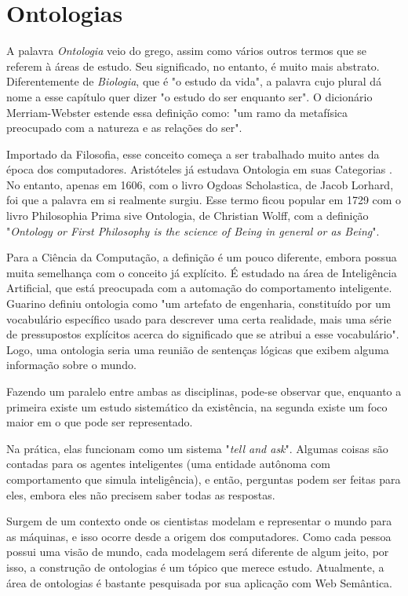 
\chapter{Ontologias}

\lettrine{A}{} palavra \textit{Ontologia} veio do grego, assim como vários outros termos que se referem à áreas de estudo. Seu significado, no entanto, é muito mais abstrato. Diferentemente de \textit{Biologia}, que é "o estudo da vida", a palavra cujo plural dá nome a esse capítulo quer dizer "o estudo do ser enquanto ser". O dicionário Merriam-Webster \cite{ontoMerriam} estende essa definição como: "um ramo da metafísica preocupado com a natureza e as relações do ser".

Importado da Filosofia, esse conceito começa a ser trabalhado muito antes da época dos computadores. Aristóteles já estudava Ontologia em suas Categorias \cite{ontoDahlberg}. No entanto, apenas em 1606, com o livro Ogdoas Scholastica, de Jacob Lorhard, foi que a palavra em si realmente surgiu. Esse termo ficou popular em 1729 com o livro Philosophia Prima sive Ontologia, de Christian Wolff, com a definição "\textit{Ontology or First Philosophy is the science of Being in general or as Being}".\cite{ontoNickles}

Para a Ciência da Computação, a definição é um pouco diferente, embora possua muita semelhança com o conceito já explícito. É estudado na área de Inteligência Artificial, que está preocupada com a automação do comportamento inteligente. Guarino \cite{ontoGuarino} definiu ontologia como "um artefato de engenharia, constituído por um vocabulário específico usado para descrever uma certa realidade, mais uma série de pressupostos explícitos acerca do significado que se atribui a esse vocabulário". Logo, uma ontologia seria uma reunião de sentenças lógicas que exibem alguma informação sobre o mundo.

Fazendo um paralelo entre ambas as disciplinas, pode-se observar que, enquanto a primeira existe um estudo sistemático da existência, na segunda existe um foco maior em o que pode ser representado.

Na prática, elas funcionam como um sistema "\textit{tell and ask}". Algumas coisas são contadas para os agentes inteligentes (uma entidade autônoma com comportamento que simula inteligência), e então, perguntas podem ser feitas para eles, embora eles não precisem saber todas as respostas. 

Surgem de um contexto onde os cientistas modelam e representar o mundo para as máquinas, e isso ocorre desde a origem dos computadores. Como cada pessoa possui uma visão de mundo, cada modelagem será diferente de algum jeito, por isso, a construção de ontologias é um tópico que merece estudo. Atualmente, a área de ontologias é bastante pesquisada por sua aplicação com Web Semântica. 

